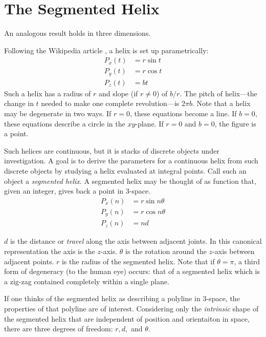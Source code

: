 \documentclass[11pt]{article}
\begin{document}
{\label{sec:2d}

\section{The Segmented Helix}

An analogous result holds in three dimensions.

Following the Wikipedia article \cite{wiki:helix},
a helix is set up parametrically:
\begin{align}
    P_x(t) &= r \sin{t}  \\
    P_y(t) &= r \cos{t} \\
   P_z(t) &= b t
\end{align}
Such a helix has a radius of $r$ and slope (if $r \neq 0$) of $b/r$.
The pitch of helix---the change in $t$ needed to make one complete revolution---is $2\pi b$.
Note that a helix may be degenerate in two ways.
If $r = 0$, these equations become a line. If $b = 0$, these equations describe a circle in the $xy$-plane.
If $r = 0$ and $b = 0$, the figure is a point.

Such helices are continuous, but it is stacks of discrete objects under investigation.
A goal is to derive
the parameters for a continuous helix from such discrete objects by studying
a helix evaluated at integral points. Call such an object a {\em segmented helix}.
A segmented helix may be thought of as function that, given an integer, gives back a point in
3-space.
\begin{align}
    P_x(n) &= r \sin{n \theta}  \\
    P_y(n) &= r \cos{n \theta} \\
   P_z(n) &= n d
\end{align}

$d$ is the distance or {\em travel} along the axis between adjacent joints. In this canonical representation the axis is
the $z$-axis.
$\theta$ is the rotation around the $z$-axis
between adjacent points.
$r$ is the radius of the segmented helix.
Note that if $\theta = \pi$, a third form of degeneracy (to the human eye) occurs:
that of a segmented helix
which is a zig-zag contained completely within a single plane.

If one thinks of the segmented helix as describing a polyline in 3-space,
the properties of that polyline are of interest.
Considering only the {\em intrinsic} shape of the segmented helix that
are independent of position and orientaiton in space,
there are three degrees
of freedom: $r,d,$ and $\theta$.

}
\end{document}
